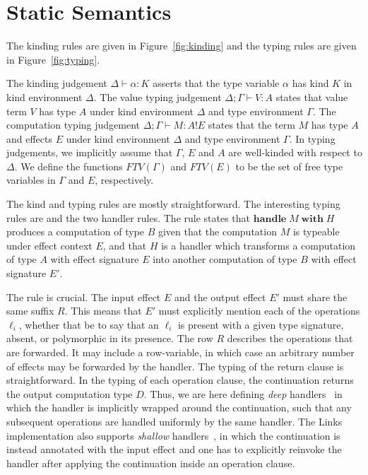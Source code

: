 \documentclass[12pt,mscres,cdtppar,twoside,openright,logo,rightchapter,normalheadings]{infthesis}
\theoremstyle{definition}
\newcommand{\tylab}[1]{\text{\scshape{T-#1}}}
\newcommand{\keyw}[1]{\textbf{#1}}
\newcommand{\Handle}{\keyw{handle}}
\newcommand{\With}{\keyw{with}}
\newcommand{\eff}{!}
\newcommand{\typv}[2]{#1 \vdash #2}
\newcommand{\typc}[3]{#1 \vdash #2 \eff #3}
\begin{document}
\section{Static Semantics}
\label{sec:typing}
The kinding rules are given in Figure~\ref{fig:kinding} and the typing
rules are given in Figure~\ref{fig:typing}.

The kinding judgement $\Delta \vdash \alpha : K$ asserts that the type
variable $\alpha$ has kind $K$ in kind environment $\Delta$. The value
typing judgement $\typv{\Delta;\Gamma}{V : A}$ states that value term
$V$ has type $A$ under kind environment $\Delta$ and type environment
$\Gamma$. The computation typing judgement $\typc{\Delta;\Gamma}{M :
  A}{E}$ states that the term $M$ has type $A$ and effects $E$ under
kind environment $\Delta$ and type environment $\Gamma$. In typing
judgements, we implicitly assume that $\Gamma$, $E$ and $A$ are
well-kinded with respect to $\Delta$. We define the functions
$FTV(\Gamma)$ and $FTV(E)$ to be the set of free type variables in
$\Gamma$ and $E$, respectively.
%

The kind and typing rules are mostly straightforward. The interesting
typing rules are \tylab{Handle} and the two handler rules. The
\tylab{Handle} rule states that $\Handle\; M\; \With\; H$ produces a
computation of type $B$ given that the computation $M$ is typeable
under effect context $E$, and that $H$ is a handler which transforms a
computation of type $A$ with effect signature $E$ into another
computation of type $B$ with effect signature $E'$.

The \tylab{Handler} rule is crucial. The input effect $E$ and the
output effect $E'$ must share the same suffix $R$. This means that
$E'$ must explicitly mention each of the operations $\ell_i$, whether
that be to say that an $\ell_i$ is present with a given type
signature, absent, or polymorphic in its presence. The row $R$
describes the operations that are forwarded. It may include a
row-variable, in which case an arbitrary number of effects may be
forwarded by the handler.
%
The typing of the return clause is straightforward. In the typing of
each operation clause, the continuation returns the output computation
type $D$. Thus, we are here defining \emph{deep}
handlers~\cite{Kammar2013} in which the handler is implicitly wrapped
around the continuation, such that any subsequent operations are
handled uniformly by the same handler.
%
The Links implementation also supports \emph{shallow}
handlers~\cite{Kammar2013}, in which the continuation is instead
annotated with the input effect and one has to explicitly reinvoke the
handler after applying the continuation inside an operation clause.
\end{document}
